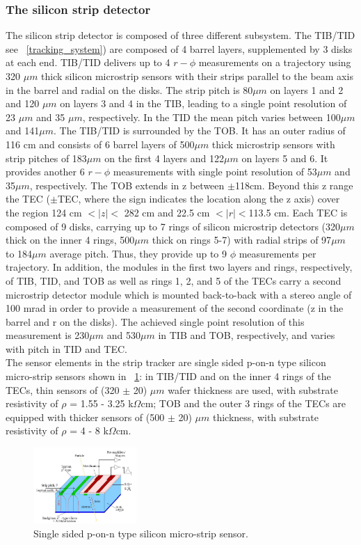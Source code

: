 \subsubsection{The silicon strip detector}
The silicon strip detector is composed of three different subsystem. The TIB/TID  see \figurename~\ref{tracking_system}) are composed of 4 barrel layers, supplemented by 3 disks at each end. TIB/TID delivers up to 4 $r-\phi$ measurements on a trajectory using 320 $\mu m$ thick silicon microstrip sensors with their strips parallel to the beam axis in the barrel and radial on the disks. The strip pitch is 80$\mu m$ on layers 1 and 2 and 120 $\mu m$ on layers 3 and 4 in the TIB, leading to a single point resolution of 23 $\mu m$ and 35 $\mu m$, respectively. In the TID the mean pitch varies between 100$\mu m$ and 141$\mu m$. The TIB/TID is surrounded by the TOB. It has an outer radius of 116 cm and consists of 6 barrel layers of 500$\mu m$ thick microstrip sensors with strip pitches of 183$\mu m$ on the first 4 layers and 122$\mu m$ on layers 5 and 6. It provides another 6 $r-\phi$ measurements with single point resolution of 53$\mu m$ and 35$\mu m$, respectively. The TOB extends in z between $\pm$118cm. Beyond this z range the TEC ($\pm$TEC, where the sign indicates the location along the z axis) cover the region 124 cm $< |z| <$ 282 cm and 22.5 cm $< |r| < $113.5 cm. Each TEC is composed of 9 disks, carrying up to 7 rings of silicon microstrip detectors (320$\mu m$ thick on the inner 4 rings, 500$\mu m$ thick on rings 5-7) with radial strips of 97$\mu m$ to 184$\mu m$ average pitch. Thus, they provide up to 9 $\phi$ measurements per trajectory. In addition, the modules in the first two layers and rings, respectively, of TIB, TID, and TOB as well as rings 1, 2, and 5 of the TECs carry a second microstrip detector module which is mounted back-to-back with a stereo angle of 100 mrad in order to provide a measurement of the second coordinate (z in the barrel and r on the disks). The achieved single point resolution of this measurement is 230$\mu m$ and 530$\mu m$ in TIB and TOB, respectively, and varies with pitch in TID and TEC. \\
The sensor elements in the strip tracker are single sided p-on-n type silicon micro-strip sensors shown in \figurename~\ref{Silicon_structure}: in TIB/TID and on the inner 4 rings of the TECs, thin sensors of (320 $\pm$ 20) $\mu m$ wafer thickness are used, with substrate resistivity of $\rho$ = 1.55 - 3.25 k$\Omega$cm; TOB and the outer 3 rings of the TECs are equipped with thicker sensors of (500 $\pm$ 20) $\mu m$ thickness, with substrate resistivity of $\rho$ = 4 - 8 k$\Omega$cm. 
\begin{figure}[htbp]
\centering
\includegraphics[width=0.35\textwidth]{Images/Silicon_structure}
\caption{Single sided p-on-n type silicon micro-strip sensor.}
\label{Silicon_structure}
\end{figure}

